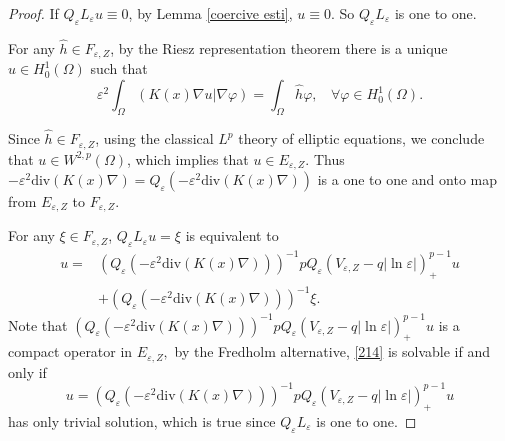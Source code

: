 \documentclass[12pt,reqno]{amsart}
\numberwithin{equation}{section}
\theoremstyle{definition}
\theoremstyle{remark}
\begin{document}
\begin{proof}
If $ Q_\varepsilon L_\varepsilon u\equiv0 $, by Lemma \ref{coercive esti}, $ u\equiv0 $. So $ Q_\varepsilon L_\varepsilon $ is  one to one.

For any $ \hat{h}\in F_{\varepsilon,Z}  $, by the Riesz representation theorem there is a unique $ u\in H^1_0(\Omega) $ such that
\begin{equation}\label{213}
\varepsilon^2\int_{\Omega}\left( K(x)\nabla u|\nabla\varphi\right) =\int_{\Omega}\hat{h}\varphi,\ \ \   \ \forall \varphi\in H^1_0(\Omega).
\end{equation}

Since $ \hat{h}\in F_{\varepsilon,Z} $, using the classical $ L^p $ theory of elliptic equations, we conclude that $ u\in W^{2,p}(\Omega) $, which implies that $ u\in E_{\varepsilon,Z}. $ Thus $ -\varepsilon^2\text{div}(K(x)\nabla)=Q_{\varepsilon}(-\varepsilon^2\text{div}(K(x)\nabla)) $ is a one to one and onto map from $ E_{\varepsilon,Z} $ to $ F_{\varepsilon, Z}. $

For any $ \xi\in F_{\varepsilon,Z} $,  $ Q_\varepsilon L_\varepsilon u=\xi $ is equivalent to
\begin{equation}\label{214}
\begin{split}
u=&\left (Q_{\varepsilon}\left (-\varepsilon^2\text{div}(K(x)\nabla)\right )\right )^{-1}pQ_\varepsilon\left (V_{\varepsilon,Z}-q|\ln\varepsilon|\right )^{p-1}_+u\\
&+\left (Q_{\varepsilon}\left (-\varepsilon^2\text{div}(K(x)\nabla)\right )\right )^{-1}\xi.%
\end{split}
\end{equation}
Note that $  (Q_{\varepsilon}(-\varepsilon^2\text{div}(K(x)\nabla)))^{-1}pQ_\varepsilon\left (V_{\varepsilon,Z}-q|\ln\varepsilon|\right )^{p-1}_+u $ is a compact operator in $ E_{\varepsilon,Z}, $ by the Fredholm alternative, \eqref{214} is solvable if and only if
\begin{equation*}
u=\left (Q_{\varepsilon}\left (-\varepsilon^2\text{div}(K(x)\nabla)\right )\right )^{-1}pQ_\varepsilon\left (V_{\varepsilon,Z}-q|\ln\varepsilon|\right )^{p-1}_+u
\end{equation*}
has only trivial solution, which is true since $ Q_\varepsilon L_\varepsilon  $ is one to one. %
\end{proof}
\end{document}
